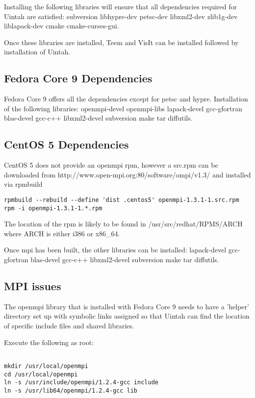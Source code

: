 Installing the following libraries will ensure that all dependencies
required for Uintah are satisfied: subversion libhypre-dev petsc-dev
libxml2-dev zlib1g-dev liblapack-dev cmake cmake-curses-gui.

Once these libraries are installed, Teem and VisIt can be installed
followed by installation of Uintah.

\subsection{Fedora Core 9 Dependencies}

Fedora Core 9 offers all the dependencies except for petsc and hypre.
Installation of the following libraries: openmpi-devel openmpi-libs
lapack-devel gcc-gfortran blas-devel gcc-c++ libxml2-devel subversion
make tar diffutils.

\subsection{CentOS 5 Dependencies}

CentOS 5 does not provide an openmpi rpm, however a src.rpm can be
downloaded from http://www.open-mpi.org:80/software/ompi/v1.3/ and
installed via rpmbuild

\begin{Verbatim}
rpmbuild --rebuild --define 'dist .centos5' openmpi-1.3.1-1.src.rpm
rpm -i openmpi-1.3.1-1.*.rpm
\end{Verbatim}

The location of the rpm is likely to be found in
/usr/src/redhat/RPMS/ARCH where ARCH is either i386 or x86\_64.

Once mpi has been built, the other libraries can be installed:
lapack-devel gcc-gfortran blas-devel gcc-c++ libxml2-devel subversion
make tar diffutils.

\subsection{MPI issues}

The openmpi library that is installed with Fedora Core 9 needs to have
a 'helper' directory set up with symbolic links assigned so that
Uintah can find the location of specific include files and shared
libraries.

Execute the following as root:

\begin{Verbatim}

mkdir /usr/local/openmpi
cd /usr/local/openmpi
ln -s /usr/include/openmpi/1.2.4-gcc include
ln -s /usr/lib64/openmpi/1.2.4-gcc lib

\end{Verbatim}



